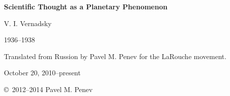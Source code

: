 \begin{titlepage}

\begin{center}
\Huge\textbf{Scientific Thought as a Planetary Phenomenon}


\bigskip
\LARGE{V. I. Vernadsky}

\Large{1936--1938}


\bigskip
\Large{Translated from Russion by Pavel M. Penev for the LaRouche movement.}
\foreignlanguage{russian}{\nocite{vernadsky2001thought}}

October 20, 2010--present

\vfill

\copyright\ 2012--2014 Pavel M. Penev

\end{center}

\end{titlepage}
